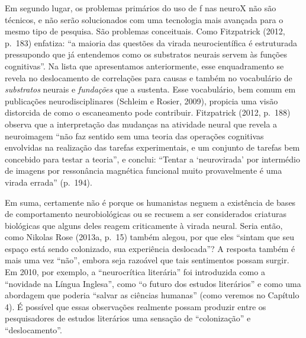 Em segundo lugar, os problemas primários do uso de f nas neuroX não
são técnicos, e não serão solucionados com uma tecnologia mais avançada
para o mesmo tipo de pesquisa. São problemas conceituais. Como
Fitzpatrick (2012, p.~183) enfatiza: ``a maioria das questões da virada
neurocientífica é estruturada pressupondo que já entendemos como os
substratos neurais servem às funções cognitivas''. Na lista que
apresentamos anteriormente, esse enquadramento se revela no deslocamento
de correlações para causas e também no vocabulário de \emph{substratos}
neurais e \emph{fundações} que a sustenta. Esse vocabulário, bem comum
em publicações neurodisciplinares (Schleim e Rosier, 2009), propicia uma
visão distorcida de como o escaneamento pode contribuir. Fitzpatrick
(2012, p.~188) observa que a interpretação das mudanças na atividade
neural que revela a neuroimagem ``não faz sentido sem uma teoria das
operações cognitivas envolvidas na realização das tarefas experimentais,
e um conjunto de tarefas bem concebido para testar a teoria'', e
conclui: ``Tentar a `neurovirada' por intermédio de imagens por
ressonância magnética funcional muito provavelmente é uma virada
errada'' (p.~194).

Em suma, certamente não é porque os humanistas neguem a existência de
bases de comportamento neurobiológicas ou se recusem a ser considerados
criaturas biológicas que alguns deles reagem criticamente à virada
neural. Seria então, como Nikolas Rose (2013a, p.~15) também alegou, por
que eles ``sintam que seu espaço está sendo colonizado, sua experiência
deslocada''? A resposta também é mais uma vez ``não'', embora seja
razoável que tais sentimentos possam surgir. Em 2010, por exemplo, a
``neurocrítica literária'' foi introduzida como a ``novidade na Língua
Inglesa'', como ``o futuro dos estudos literários'' e como uma abordagem
que poderia ``salvar as ciências humanas'' (como veremos no Capítulo 4).
É possível que essas observações realmente possam produzir entre os
pesquisadores de estudos literários uma sensação de ``colonização'' e
``deslocamento''.

